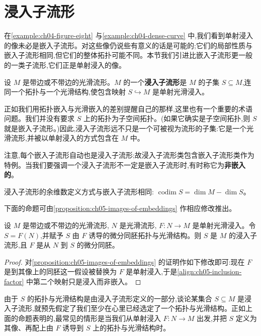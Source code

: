 \documentclass[../../main.tex]{subfiles}
\begin{document}
\section{浸入子流形}\label{section:ch05-浸入子流形}

在\cref{example:ch04-figure-eight} 与\cref{example:ch04-dense-curve} 中,我们看到单射浸入的像未必是嵌入子流形。对这些像仍说些有意义的话是可能的;它们的局部性质与嵌入子流形相同,但它们的整体拓扑可能不同。本节我们引进比嵌入子流形更一般的一类子流形,它们正是单射浸入的像。

设 $M$ 是带边或不带边的光滑流形。$M$ 的一个\textbf{浸入子流形}是 $M$ 的子集 $S\subseteq M$,连同一个拓扑与一个光滑结构,使包含映射 $S\hookrightarrow M$ 是单射光滑浸入。

正如我们用拓扑嵌入与光滑嵌入的差别提醒自己的那样,这里也有一个重要的术语问题。我们并没有要求 $S$ 上的拓扑为子空间拓扑。(如果它确实是子空间拓扑,则 $S$ 就是嵌入子流形。)因此,浸入子流形远不只是一个可被视为流形的子集:它是一个光滑流形,并被以单射浸入的方式包含在 $M$ 中。

注意,每个嵌入子流形自动也是浸入子流形;故浸入子流形类包含嵌入子流形类作为特例。当我们要强调一个浸入子流形不一定是嵌入子流形时,有时称它为\textbf{非嵌入的}。

浸入子流形的余维数定义方式与嵌入子流形相同: $\operatorname{codim}S=\dim M-\dim S$。

下面的命题可由\cref{proposition:ch05-images-of-embeddings} 作相应修改推出。

\begin{proposition}\label{proposition:ch05-injective-immersion-images}
设 $M$ 是带边或不带边的光滑流形, $N$ 是光滑流形, $F:N\to M$ 是单射光滑浸入。令 $S=F(N)$,并赋予 $S$ 由 $F$ 诱导的微分同胚拓扑与光滑结构。则 $S$ 是 $M$ 的浸入子流形,且 $F$ 是从 $N$ 到 $S$ 的微分同胚。
\end{proposition}

\begin{proof}
对\cref{proposition:ch05-images-of-embeddings} 的证明作如下修改即可:现在 $F$ 是到其像上的同胚这一假设被替换为 $F$ 是单射浸入,于是\eqref{align:ch05-inclusion-factor} 中第二个映射只是浸入而非嵌入。
\end{proof}

由于 $S$ 的拓扑与光滑结构是由浸入子流形定义的一部分,谈论某集合 $S\subseteq M$ 是浸入子流形,就预先假定了我们至少在心里已经选定了一个拓扑与光滑结构。正如上面的命题表明的,最常见的情形是当我们从单射浸入 $F:N\to M$ 出发,并把 $S$ 定义为其像、再配上由 $F$ 诱导到 $S$ 上的拓扑与光滑结构时。
\end{document}
